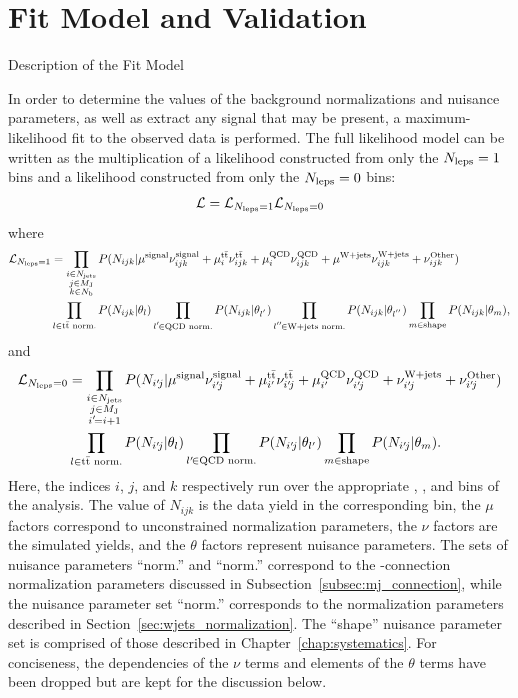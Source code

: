 \chapter{Fit Model and Validation}

\begin{section}{Description of the Fit Model}
\label{sec:fit_model}

In order to determine the values of the background normalizations and nuisance parameters, as well as extract any signal that may be present, a maximum-likelihood fit to the observed data is performed. 
The full likelihood model can be written as the multiplication of a likelihood constructed from only the $N_{\mathrm{leps}} = 1$ bins and a likelihood constructed from only the $N_{\mathrm{leps}} = 0$ bins:
\begin{align}
\mathcal{L} = \mathcal{L}_{N_{\mathrm{leps}} = 1} \mathcal{L}_{N_{\mathrm{leps}} = 0}
\end{align}
where
\begin{align}
\mathcal{L}_{\Nleps = 1}& = \prod_{\substack{i\in\Njets\\ j\in\MJ\\ k \in\Nb}}
P(N_{ijk}|\mu^{\signal}\nu^{\signal}_{ijk} + \mu^{\ttbar}_{i}\nu^{\ttbar}_{ijk} + \mu^{\QCD}_{i}\nu^{\QCD}_{ijk} + \mu^{\Wjets}\nu^{\Wjets}_{ijk} + \nu^{\Other}_{ijk}) \nonumber \\
                        &\prod_{l\in\text{\ttbar norm.}} P(N_{ijk}|\theta_{l}) \prod_{l^{'}\!\in\text{QCD norm.}} P(N_{ijk}|\theta_{l^{'}}) \prod_{l^{''}\!\in\text{W+jets norm.}} P(N_{ijk}|\theta_{l^{''}}) \prod_{m\in\text{shape}} P(N_{ijk}|\theta_{m}),
\end{align}
and 
\begin{align}
\mathcal{L}_{\Nleps = 0} &= \prod_{\substack{i\in\Njets\\ j\in\MJ\\ i'\!= i + 1}}
P(N_{i'\!j}|\mu^{\signal}\nu^{\signal}_{i'\!j} + \mu^{\ttbar}_{i'}\nu^{\ttbar}_{i'\!j} + \mu^{\QCD}_{i'}\nu^{\QCD}_{i'\!j} + \nu^{\Wjets}_{i'\!j} + \nu^{\Other}_{i'\!j}) \nonumber \\
                         &\prod_{l\in\text{\ttbar norm.}} P(N_{i'\!j}|\theta_{l}) \prod_{l'\!\in\text{QCD norm.}} P(N_{i'\!j}|\theta_{l'}) \prod_{m\in\text{shape}} P(N_{i'\!j}|\theta_{m}).
\end{align}
Here, the indices $i$, $j$, and $k$ respectively run over the appropriate \Njets, \MJ, and \Nb bins of the analysis.
The value of $N_{ijk}$ is the data yield in the corresponding bin, the $\mu$ factors correspond to unconstrained normalization parameters, the $\nu$ factors are the simulated yields, and the $\theta$ factors represent nuisance parameters.
The sets of nuisance parameters ``\ttbar norm.'' and ``\QCD norm.'' correspond to the \MJ-connection normalization parameters discussed in Subsection~\ref{subsec:mj_connection}, while the nuisance parameter set ``\Wjets norm.'' corresponds to the normalization parameters described in Section~\ref{sec:wjets_normalization}. 
The ``shape'' nuisance parameter set is comprised of those described in Chapter~\ref{chap:systematics}.
For conciseness, the dependencies of the $\nu$ terms and elements of the $\theta$ terms have been dropped but are kept for the discussion below.


\end{section}
